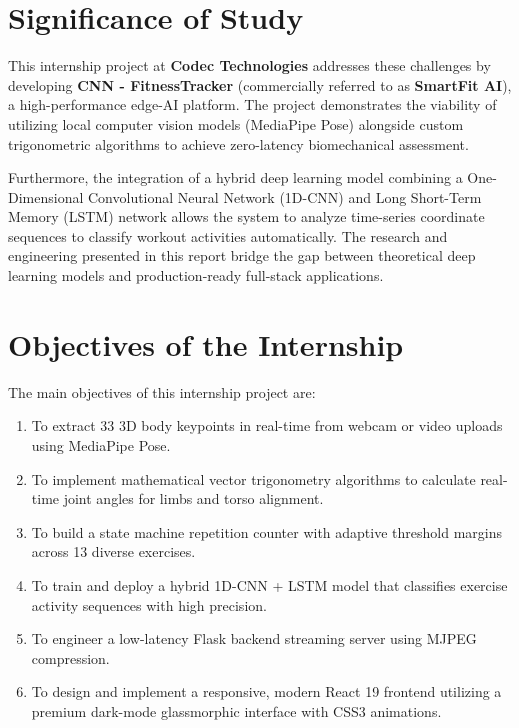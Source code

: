 \section{Significance of Study}
This internship project at \textbf{Codec Technologies} addresses these challenges by developing \textbf{CNN - FitnessTracker} (commercially referred to as \textbf{SmartFit AI}), a high-performance edge-AI platform. The project demonstrates the viability of utilizing local computer vision models (MediaPipe Pose) alongside custom trigonometric algorithms to achieve zero-latency biomechanical assessment. 

Furthermore, the integration of a hybrid deep learning model combining a One-Dimensional Convolutional Neural Network (1D-CNN) and Long Short-Term Memory (LSTM) network allows the system to analyze time-series coordinate sequences to classify workout activities automatically. The research and engineering presented in this report bridge the gap between theoretical deep learning models and production-ready full-stack applications.

\section{Objectives of the Internship}
The main objectives of this internship project are:
\begin{enumerate}
    \item To extract 33 3D body keypoints in real-time from webcam or video uploads using MediaPipe Pose.
    \item To implement mathematical vector trigonometry algorithms to calculate real-time joint angles for limbs and torso alignment.
    \item To build a state machine repetition counter with adaptive threshold margins across 13 diverse exercises.
    \item To train and deploy a hybrid 1D-CNN + LSTM model that classifies exercise activity sequences with high precision.
    \item To engineer a low-latency Flask backend streaming server using MJPEG compression.
    \item To design and implement a responsive, modern React 19 frontend utilizing a premium dark-mode glassmorphic interface with CSS3 animations.
\end{enumerate}


